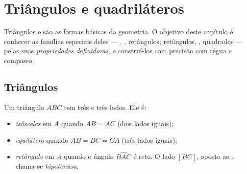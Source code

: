 \chapter{Triângulos e quadriláteros}\label{ch:g6:shapes}

Triângulos e  são as formas básicas da geometria. O
objetivo deste capítulo é conhecer as famílias especiais deles ---
, , retângulos; retângulos, , quadrados ---
pelas suas \emph{propriedades definidoras}, e construí-los com precisão
com régua e compasso.

\section{Triângulos}

\begin{definition}\label{def:g6:shapes:triangles}
Um triângulo $ABC$ tem três  e três lados. Ele é:
\begin{itemize}
  \item \emph{isósceles} em $A$ quando
        $AB = AC$ (dois lados iguais);
  \item \emph{equilátero} quando
        $AB = BC = CA$ (três lados iguais);
  \item \emph{retângulo} em $A$ quando o
        ângulo $\widehat{BAC}$ é reto. O lado $[BC]$, oposto ao , chama-se \emph{hipotenusa}.
\end{itemize}
\end{definition}

